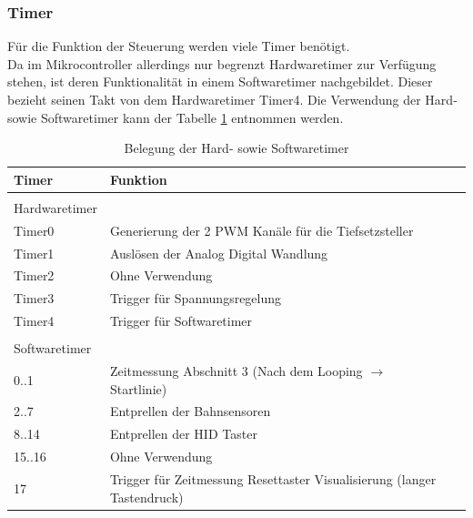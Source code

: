 \documentclass[a4paper, 11pt]{report}
\begin{document}
			\subsubsection{Timer}\label{subsubsec:Timer}
			Für die Funktion der Steuerung werden viele Timer benötigt.\\
			Da im Mikrocontroller allerdings nur begrenzt Hardwaretimer zur Verfügung stehen, ist deren Funktionalität in einem Softwaretimer nachgebildet.
			Dieser bezieht seinen Takt von dem  Hardwaretimer \glqq Timer4\grqq.
			Die Verwendung der Hard- sowie Softwaretimer kann der Tabelle \ref{tab:belegungTimer} entnommen werden.
				\begin{table}[ht]
					\begin{tabular}{|l|l|l|}
						\hline
						\textbf{Timer} & \textbf{Funktion}\\
						\hline
						\hline
						 & \\
						Hardwaretimer &\\
						\hline
						\hline
						Timer0 & Generierung der 2 PWM Kanäle für die Tiefsetzsteller\\
						\hline
						Timer1 & Auslösen der Analog Digital Wandlung\\
						\hline
						Timer2 & Ohne Verwendung\\
						\hline
						Timer3 & Trigger für Spannungsregelung\\
						\hline
						Timer4 & Trigger für Softwaretimer\\
						\hline
						\hline
						 & \\
						Softwaretimer &\\
						\hline
						\hline
						0..1 & Zeitmessung Abschnitt 3 (Nach dem Looping $\rightarrow$ Startlinie)\\
						\hline
						2..7 & Entprellen der Bahnsensoren\\
						\hline
						8..14 & Entprellen der HID Taster\\
						\hline
						15..16 & Ohne Verwendung\\
						\hline
						17 & Trigger für Zeitmessung Resettaster Visualisierung (langer Tastendruck)\\
						\hline
					\end{tabular}
					\caption{Belegung der Hard- sowie Softwaretimer}
					\label{tab:belegungTimer}
				\end{table}
\end{document}
